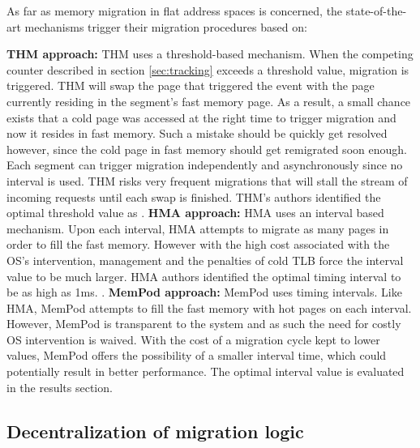 As far as memory migration in flat address spaces is concerned, the state-of-the-art mechanisms trigger their migration procedures based on:

	\textbf{THM approach:} THM uses a threshold-based mechanism. When the competing counter described in section \ref{sec:tracking} exceeds a threshold value, migration is triggered. THM will swap the page that triggered the event with the page currently residing in the segment's fast memory page. As a result, a small chance exists that a cold page was accessed at the right time to trigger migration and now it resides in fast memory. Such a mistake should be quickly get resolved however, since the cold page in fast memory should get remigrated soon enough. Each segment can trigger migration independently and asynchronously since no interval is used. THM risks very frequent migrations that will stall the stream of incoming requests until each swap is finished.  THM's authors identified the optimal threshold value as . 
	\textbf{HMA approach:} HMA uses an interval based mechanism. Upon each interval, HMA attempts to migrate as many pages in order to fill the fast memory. However with the high cost associated with the OS's intervention, management and the penalties of cold TLB force the interval value to be much larger. HMA authors identified the optimal timing interval to be as high as 1ms. .
	\textbf{MemPod approach:} MemPod uses timing intervals. Like HMA, MemPod attempts to fill the fast memory with hot pages on each interval. However, MemPod is transparent to the system and as such the need for costly OS intervention is waived. With the cost of a migration cycle kept to lower values, MemPod offers the possibility of a smaller interval time, which could potentially result in better performance. The optimal interval value is evaluated in the results section.

\subsection{Decentralization of migration logic}

